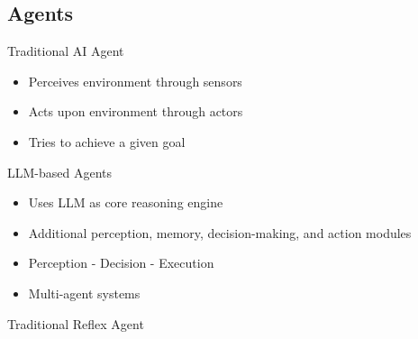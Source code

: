 \subsection{Agents}
\begin{frame}{\insertsubsection{} }
	\begin{fancycolumns}[animation=none]
		\begin{definition}{Traditional AI Agent}
			\begin{itemize}
				\item Perceives environment through sensors
				\item Acts upon environment through actors
				\item Tries to achieve a given goal
			\end{itemize}
		\end{definition} \pause
		\begin{definition}{LLM-based Agents}
			\begin{itemize}
				\item Uses LLM as core reasoning engine
				\item Additional perception, memory, decision-making, and action modules
				\item Perception - Decision - Execution
				\item Multi-agent systems
			\end{itemize}
		\end{definition} \pause
		\nextcolumn
		\begin{example}{Traditional Reflex Agent}
			\centering{}
		\end{example}
	\end{fancycolumns}
\end{frame}
